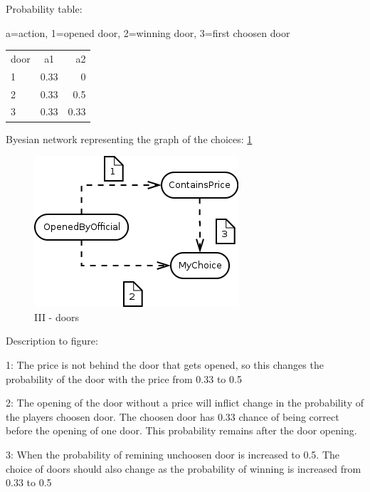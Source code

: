 \documentclass[12pt, a4paper]{article}
\begin{document}
Probability table: 

a=action, 1=opened door, 2=winning door, 3=first choosen door \\
\begin{tabular}{ l c r }
  door & a1 & a2 \\
  1 & 0.33 & 0 \\
  2 & 0.33 & 0.5 \\
  3 & 0.33 & 0.33 \\
\end{tabular}

Byesian network representing the graph of the choices: \ref{III}
\begin{figure}[htb]
    \centering
    \includegraphics[width=\textwidth]{doors}
    \caption{III - doors}
    \label{III}
\end{figure}

Description to figure: 

1: The price is not behind the door that gets opened, so this changes the probability of the door with the price from 0.33 to 0.5

2: The opening of the door without a price will inflict change in the probability of the players choosen door. 
The choosen door has 0.33 chance of being correct before the opening of one door. This probability remains after the door opening. 

3: When the probability of remining unchoosen door is increased to 0.5.
The choice of doors should also change as the probability of winning is increased from 0.33 to 0.5 
\end{document}
